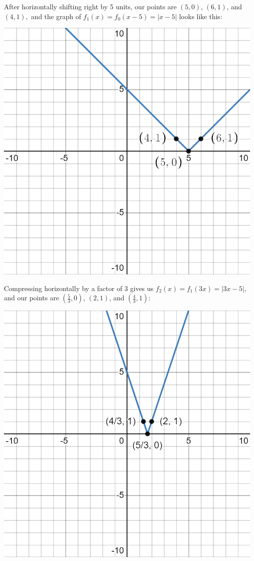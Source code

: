 \documentclass[handout, noauthor, nooutcomes]{ximera}
\begin{document}
\begin{example}
\begin{explanation}
After horizontally shifting right  by 5 units, our points are $(5, 0)$, $(6, 1)$, and $(4, 1),$ and the graph of $f_1(x) = f_0(x - 5) = |x - 5|$ looks like this:

\includegraphics[width=1\linewidth]{images/exgraph2.png}

Compressing horizontally by a factor of 3 gives us $f_2(x) = f_1(3x) = |3x - 5|$, and our points are $\left(\frac{5}{3}, 0\right)$, $(2, 1)$, and $\left(\frac{4}{3}, 1\right)$:

\includegraphics[width=1\linewidth]{images/exgraph3.png}


\end{explanation}
\end{example}
\end{document}
